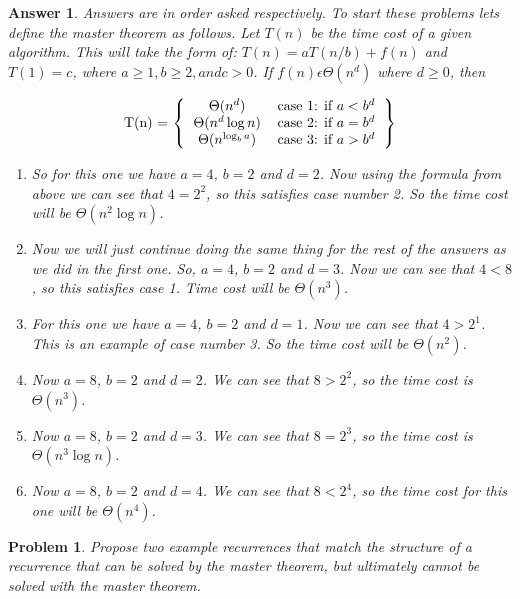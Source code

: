 \documentclass[11pt]{article}
\newtheorem{problem}{Problem}
\newtheorem{answer}{Answer}
\begin{document}
\begin{answer}
 \label{ans:1}
  Answers are in order asked respectively. To start these problems lets define the master theorem as follows. Let $T(n)$ be the time cost of a given algorithm. This will take the form of: $T(n) = aT(n/b) + f(n)$ and $T(1) = c$, where $a \geq 1, b \geq 2, and c > 0$. If $f(n)   \epsilon  \Theta{(n^d)}$ where $d \geq 0$, then 
  \begin{center}
  	\[
  	$T(n) = $
  	\left \{
	  	\begin{tabular}{cc}
		  	$\Theta{(n^d)}$ & case 1: if $a < b^d$\\
	  		$\Theta{(n^d\log{n})}$ & case 2: if $a = b^d$\\
	  		$\Theta{(n^{\log_b{a}})}$ & case 3: if $a > b^d$
	  	\end{tabular}
    \right \}
    \]
  \end{center}
  
  \bigskip
  
  \begin{enumerate}
  	\item So for this one we have $a = 4$, $b = 2$ and $d = 2$. Now using the formula from above we can see that $4 = 2^2$, so this satisfies case number 2. So the time cost will be $\Theta{(n^2\log{n})}$.
  	\item Now we will just continue doing the same thing for the rest of the answers as we did in the first one. So, $a = 4$, $b = 2$ and $d = 3$. Now we can see that $4 < 8$, so this satisfies case 1. Time cost will be $\Theta{(n^3)}$.
  	\item For this one we have $a = 4$, $b = 2$ and $d = 1$. Now we can see that $4 > 2^1$. This is an example of case number 3. So the time cost will be $\Theta{(n^2)}$.
  	\item Now $a = 8$, $b = 2$ and $d = 2$. We can see that $8 > 2^2$, so the time cost is $\Theta{(n^3)}$.
  	\item Now $a = 8$, $b = 2$ and $d = 3$. We can see that $8 = 2^3$, so the time cost is $\Theta{(n^3\log{n})}$.
  	\item Now $a = 8$, $b = 2$ and $d = 4$. We can see that $8 < 2^4$, so the time cost for this one will be $\Theta{(n^4)}$.
  \end{enumerate}
\end{answer}

\bigskip

\begin{problem}
 \label{prob:2} Propose two example recurrences that match the structure of a recurrence that can be solved by the master theorem, but ultimately cannot be solved with the master theorem.
\end{problem}
\end{document}
